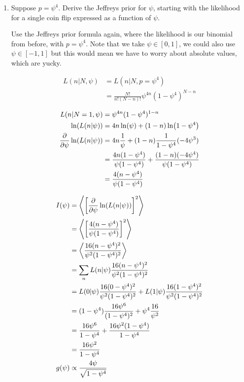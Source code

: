 \begin{enumerate}[label=\textbf{\Alph*}.]
    \item Suppose $p = \psi^4$. Derive the Jeffreys prior for $\psi$, starting with the likelihood for a single coin flip expressed as a function of $\psi$.
    
    Use the Jeffreys prior formula again, where the likelihood is  our binomial from before, with $p = \psi^4$. Note that we take $\psi \in [0, 1]$, we could also use $\psi \in [-1, 1]$ but this would mean we have to worry about absolute values, which are yucky.

    \begin{align*}
        L(n|N, \psi) &= L(n|N, p=\psi^4) \\
        &= \frac{N!}{n!(N-n)!} \psi^{4n} (1-\psi^4)^{N-n} \\
    \end{align*}
    \begin{align*}
        L(n|N=1, \psi) &= \psi^{4n} (1-\psi^4)^{1-n} \\
        \ln(L(n|\psi)) &= 4n\ln(\psi) + (1-n)\ln(1-\psi^4) \\
        \frac{\partial}{\partial \psi} \ln(L(n|\psi)) &= 4n\frac{1}{\psi} + (1-n)\frac{1}{1-\psi^4}(-4\psi^3) \\
        &= \frac{4n(1-\psi^4)}{\psi(1-\psi^4)} + \frac{(1-n)(-4\psi^4)}{\psi(1-\psi^4)} \\
        &= \frac{4(n-\psi^4)}{\psi(1-\psi^4)} \\
    \end{align*}

    \begin{align*}
        I(\psi) &=  \left< \left[\frac{\partial}{\partial \psi} \ln(L(n|\psi))\right]^2 \right> \\
        &= \left< \left[\frac{4(n-\psi^4)}{\psi(1-\psi^4)}\right]^2 \right> \\
        &= \left< \frac{16(n-\psi^4)^2}{\psi^2(1-\psi^4)^2} \right> \\
        &= \sum_n L(n|\psi) \frac{16(n-\psi^4)^2}{\psi^2(1-\psi^4)^2} \\
        &= L(0|\psi) \frac{16(0-\psi^4)^2}{\psi^2(1-\psi^4)^2} + L(1|\psi) \frac{16(1-\psi^4)^2}{\psi^2(1-\psi^4)^2} \\
        &= (1-\psi^4) \frac{16\psi^6}{(1-\psi^4)^2} + \psi^4 \frac{16}{\psi^2} \\
        &= \frac{16\psi^6}{1-\psi^4} +  \frac{16\psi^2(1-\psi^4)}{1-\psi^4} \\
        &= \frac{16\psi^2}{1-\psi^4} \\
        g(\psi) &\propto \frac{4\psi}{\sqrt{1-\psi^4}} \\
    \end{align*}


\end{enumerate}
